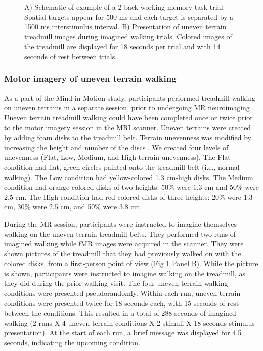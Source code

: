 \documentclass[a4paper,fleqn]{cas-sc}
\begin{document}
\begin{figure}[ht]
\begin{minipage}{0.4\textwidth}
         \label{fig:b}
    \end{minipage}
    \caption{A) Schematic of example of a 2-back working memory task trial. Spatial targets appear for 500 ms and each target is separated by a 1500 ms interstimulus interval. B) Presentation of uneven terrain treadmill images during imagined walking trials. Colored images of the treadmill are displayed for 18 seconds per trial and with 14 seconds of rest between trials.}
    \label{fig:fmriTasks}
\end{figure}


\subsubsection{Motor imagery of uneven terrain walking}
As a part of the Mind in Motion study, participants performed treadmill walking on uneven terrains in a separate session, prior to undergoing MR neuroimaging \citep{Downey2022}. Uneven terrain treadmill walking could have been completed once or twice prior to the motor imagery session in the MRI scanner. 
Uneven terrains were created by adding foam disks to the treadmill belt. Terrain unevenness was modified by increasing the height and number of the discs \citep{Voloshina2013, Downey2022}. We created four levels of unevenness (Flat, Low, Medium, and High terrain unevenness). The Flat condition had flat, green circles painted onto the treadmill belt (i.e., normal walking). The Low condition had yellow-colored 1.3 cm-high disks. The Medium condition had orange-colored disks of two heights: 50\% were 1.3 cm and 50\% were 2.5 cm. The High condition had red-colored disks of three heights: 20\% were 1.3 cm, 30\% were 2.5 cm, and 50\% were 3.8 cm.

During the MR session, participants were instructed to imagine themselves walking on the uneven terrain treadmill belts. They performed two runs of imagined walking while fMR images were acquired in the scanner. They were shown pictures of the treadmill that they had previously walked on with the colored disks, from a first-person point of view (Fig 1 Panel B). While the picture is shown, participants were instructed to imagine walking on the treadmill, as they did during the prior walking visit. The four uneven terrain walking conditions were presented pseudorandomly. Within each run, uneven terrain conditions were presented twice for 18 seconds each, with 15 seconds of rest between the conditions. This resulted in a total of 288 seconds of imagined walking (2 runs X 4 uneven terrain conditions X 2 stimuli X 18 seconds stimulus presentation). At the start of each run, a brief message was displayed for 4.5 seconds, indicating the upcoming condition.
\end{document}
